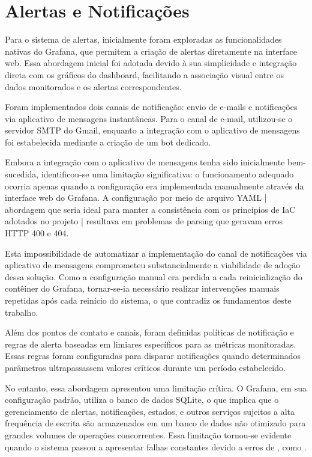 \section{Alertas e Notificações}
\label{section:Alertas}

Para o sistema de alertas, inicialmente foram exploradas as funcionalidades nativas do Grafana, que permitem a criação de alertas diretamente na interface web. Essa abordagem inicial foi adotada devido à sua simplicidade e integração direta com os gráficos do dashboard, facilitando a associação visual entre os dados monitorados e os alertas correspondentes.

Foram implementados dois canais de notificação: envio de e-mails e notificações via aplicativo de mensagens instantâneas. Para o canal de e-mail, utilizou-se o servidor SMTP do Gmail, enquanto a integração com o aplicativo de mensagens foi estabelecida mediante a criação de um bot dedicado.

Embora a integração com o aplicativo de mensagens tenha sido inicialmente bem-sucedida, identificou-se uma limitação significativa: o funcionamento adequado ocorria apenas quando a configuração era implementada manualmente através da interface web do Grafana. A configuração por meio de arquivo YAML | abordagem que seria ideal para manter a consistência com os princípios de IaC adotados no projeto | resultava em problemas de parsing que geravam erros HTTP 400 e 404.

Esta impossibilidade de automatizar a implementação do canal de notificações via aplicativo de mensagens comprometeu substancialmente a viabilidade de adoção dessa solução. Como a configuração manual era perdida a cada reinicialização do contêiner do Grafana, tornar-se-ia necessário realizar intervenções manuais repetidas após cada reinício do sistema, o que contradiz os fundamentos deste trabalho.

Além dos pontos de contato e canais, foram definidas políticas de notificação e regras de alerta baseadas em limiares específicos para as métricas monitoradas. Essas regras foram configuradas para disparar notificações quando determinados parâmetros ultrapassassem valores críticos durante um período estabelecido.

No entanto, essa abordagem apresentou uma limitação crítica. O Grafana, em sua configuração padrão, utiliza o banco de dados SQLite, o que implica que o gerenciamento de alertas, notificações, estados,  e outros serviços sujeitos a alta frequência de escrita são armazenados em um banco de dados não otimizado para grandes volumes de operações concorrentes. Essa limitação tornou-se evidente quando o sistema passou a apresentar falhas constantes devido a erros de , como .

